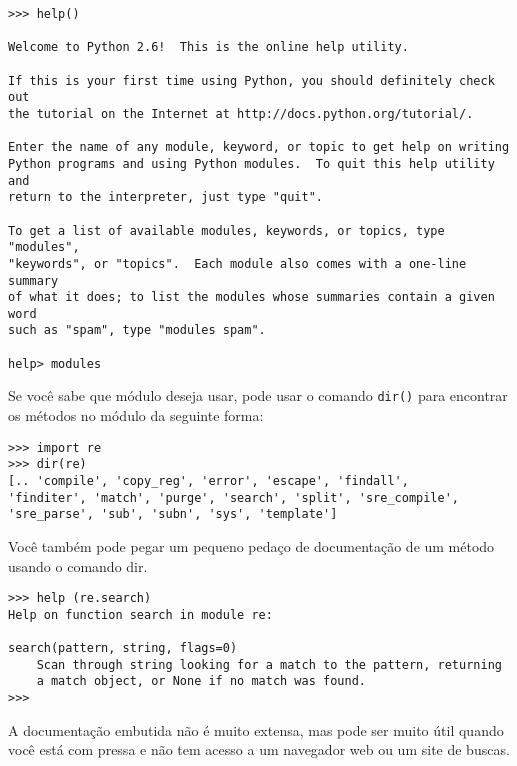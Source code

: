 \beforeverb
\begin{verbatim}
>>> help()

Welcome to Python 2.6!  This is the online help utility.

If this is your first time using Python, you should definitely check out
the tutorial on the Internet at http://docs.python.org/tutorial/.

Enter the name of any module, keyword, or topic to get help on writing
Python programs and using Python modules.  To quit this help utility and
return to the interpreter, just type "quit".

To get a list of available modules, keywords, or topics, type "modules",
"keywords", or "topics".  Each module also comes with a one-line summary
of what it does; to list the modules whose summaries contain a given word
such as "spam", type "modules spam".

help> modules
\end{verbatim}
\afterverb
%

Se você sabe que módulo deseja usar, pode usar o comando {\tt dir()} para encontrar os métodos 
no módulo da seguinte forma:

\beforeverb
\begin{verbatim}
>>> import re
>>> dir(re)
[.. 'compile', 'copy_reg', 'error', 'escape', 'findall', 
'finditer', 'match', 'purge', 'search', 'split', 'sre_compile', 
'sre_parse', 'sub', 'subn', 'sys', 'template']
\end{verbatim}
\afterverb
%
Você também pode pegar um pequeno pedaço de documentação de um método usando o comando dir.

\beforeverb
\begin{verbatim}
>>> help (re.search)
Help on function search in module re:

search(pattern, string, flags=0)
    Scan through string looking for a match to the pattern, returning
    a match object, or None if no match was found.
>>> 
\end{verbatim}
\afterverb
%
A documentação embutida não é muito extensa, mas pode ser muito útil quando você está com pressa 
e não tem acesso a um navegador web ou um site de buscas.


